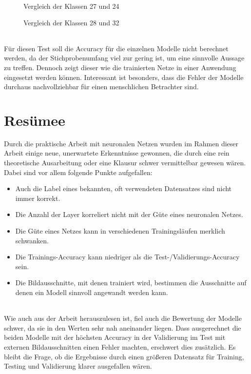 \begin{figure} [!ht]
	\centering
	\caption{Vergleich der Klassen 27 und 24} \label{pic:27-24}
\end{figure}

\begin{figure} [!ht]
	\centering
	\caption{Vergleich der Klassen 28 und 32} \label{pic:28-32}
\end{figure} \ \\
%
Für diesen Test soll die Accuracy für die einzelnen Modelle nicht berechnet werden, da der Stichprobenumfang viel zur gering ist, um eine sinnvolle Aussage zu treffen. Dennoch zeigt dieser wie die trainierten Netze in einer Anwendung eingesetzt werden können. Interessant ist besonders, dass die Fehler der Modelle durchaus nachvollziehbar für einen menschlichen Betrachter sind. 
\newpage

\section{Resümee}
Durch die praktische Arbeit mit neuronalen Netzen wurden im Rahmen dieser Arbeit einige neue, unerwartete Erkenntnisse gewonnen, die durch eine rein theoretische Ausarbeitung oder eine Klausur schwer vermittelbar gewesen wären. Dabei sind vor allem folgende Punkte aufgefallen:

\begin{itemize}
	\item Auch die Label eines bekannten, oft verwendeten Datensatzes sind nicht immer korrekt.
	\item Die Anzahl der Layer korreliert nicht mit der Güte eines neuronalen Netzes.
	\item Die Güte eines Netzes kann in verschiedenen Trainingsläufen merklich schwanken.
	\item Die Trainings-Accuracy kann niedriger als die Test-/Validierungs-Accuracy sein.
	\item Die Bildausschnitte, mit denen trainiert wird, bestimmen die Ausschnitte auf denen ein Modell sinnvoll angewandt werden kann.
\end{itemize} \ \\
Wie auch aus der Arbeit herauszulesen ist, fiel auch die Bewertung der Modelle schwer, da sie in den Werten sehr nah aneinander liegen. Dass ausgerechnet die beiden Modelle mit der höchsten Accuracy in der Validierung im Test mit externen Bildausschnitten einen Fehler machten, erschwert dies zusätzlich. Es bleibt die Frage, ob die Ergebnisse durch einen größeren Datensatz für Training, Testing und Validierung klarer ausgefallen wären.
